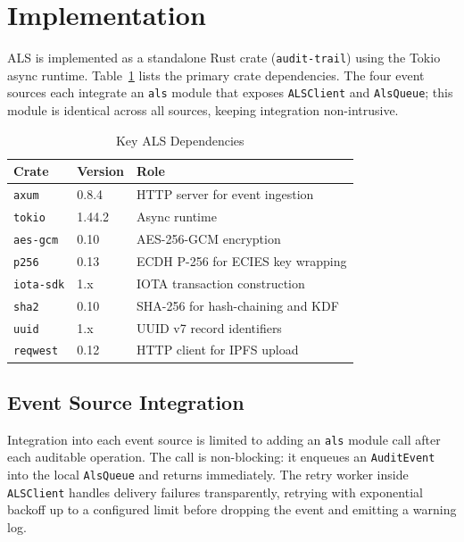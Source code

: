 \section{Implementation}
\label{sec:implementation}

ALS is implemented as a standalone Rust crate (\texttt{audit-trail}) using
the Tokio async runtime. Table~\ref{tab:deps} lists the primary crate
dependencies. The four event sources each integrate an \texttt{als} module
that exposes \texttt{ALSClient} and \texttt{AlsQueue}; this module is
identical across all sources, keeping integration non-intrusive.

\begin{table}[htbp]
    \caption{Key ALS Dependencies}
    \label{tab:deps}
    \begin{center}
        \begin{tabular}{l l p{4cm}}
            \toprule
            \textbf{Crate} & \textbf{Version} & \textbf{Role} \\
            \midrule
            \texttt{axum}       & 0.8.4  & HTTP server for event ingestion \\
            \texttt{tokio}      & 1.44.2 & Async runtime \\
            \texttt{aes-gcm}    & 0.10   & AES-256-GCM encryption \\
            \texttt{p256}       & 0.13   & ECDH P-256 for ECIES key wrapping \\
            \texttt{iota-sdk}   & 1.x    & IOTA transaction construction \\
            \texttt{sha2}       & 0.10   & SHA-256 for hash-chaining and KDF \\
            \texttt{uuid}       & 1.x    & UUID v7 record identifiers \\
            \texttt{reqwest}    & 0.12   & HTTP client for IPFS upload \\
            \bottomrule
        \end{tabular}
    \end{center}
\end{table}

\subsection{Event Source Integration}

Integration into each event source is limited to adding an \texttt{als}
module call after each auditable operation. The call is non-blocking: it
enqueues an \texttt{AuditEvent} into the local \texttt{AlsQueue} and returns
immediately. The retry worker inside \texttt{ALSClient} handles delivery
failures transparently, retrying with exponential backoff up to a configured
limit before dropping the event and emitting a warning log.

